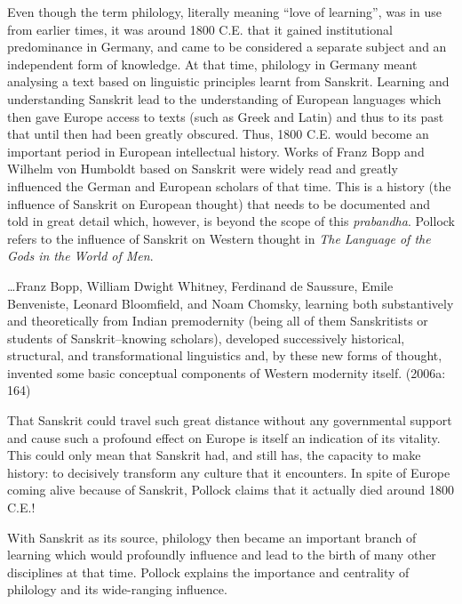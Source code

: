 Even though the term philology, literally meaning “love of learning”, was in use from earlier times, it was around 1800 C.E. that it gained institutional predominance in Germany, and came to be considered a separate subject and an independent form of knowledge. At that time, philology in Germany meant analysing a text based on linguistic principles learnt from Sanskrit. Learning and understanding Sanskrit lead to the understanding of European languages which then gave Europe access to texts (such as Greek and Latin) and thus to its past that until then had been greatly obscured. Thus, 1800 C.E. would become an important period in European intellectual history. Works of Franz Bopp and Wilhelm von Humboldt based on Sanskrit were widely read and greatly influenced the German and European scholars of that time. This is a history (the influence of Sanskrit on European thought) that needs to be documented and told in great detail which, however, is beyond the scope of this \textit{prabandha}. Pollock refers to the influence of Sanskrit on Western thought in \textit{The Language of the Gods in the World of Men}.

\begin{myquote}
…Franz Bopp, William Dwight Whitney, Ferdinand de Saussure, Emile Benveniste, Leonard Bloomﬁeld, and Noam Chomsky, learning both substantively and theoretically from Indian premodernity (being all of them Sanskritists or students of Sanskrit–knowing scholars), developed successively historical, structural, and transformational linguistics and, by these new forms of thought, invented some basic conceptual components of Western modernity itself. (2006a: 164)
\end{myquote}

That Sanskrit could travel such great distance without any governmental support and cause such a profound effect on Europe is itself an indication of its vitality. This could only mean that Sanskrit had, and still has, the capacity to make history: to decisively transform any culture that it encounters. In spite of Europe coming alive because of Sanskrit, Pollock claims that it actually died around 1800 C.E.!

With Sanskrit as its source, philology then became an important branch of learning which would profoundly influence and lead to the birth of many other disciplines at that time. Pollock explains the importance and centrality of philology and its wide-ranging influence.

